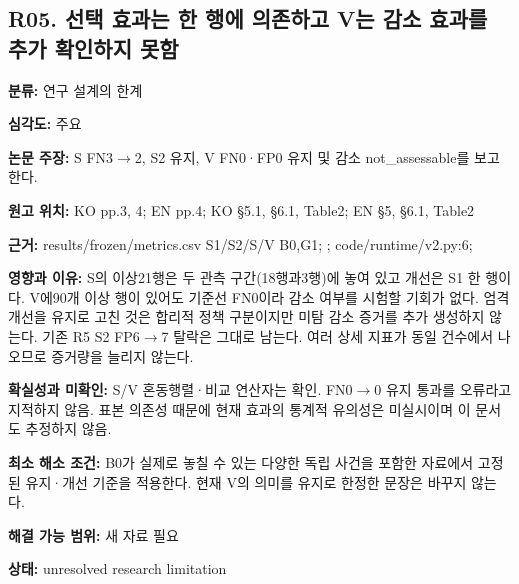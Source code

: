 \documentclass[11pt,a4paper]{article}
\begin{document}
\subsection*{R05. 선택 효과는 한 행에 의존하고 V는 감소 효과를 추가 확인하지 못함}
\textbf{분류:} 연구 설계의 한계
\par
\textbf{심각도:} 주요
\par
\textbf{논문 주장:} S FN3$\to$2, S2 유지, V FN0·FP0 유지 및 감소 not\_assessable를 보고한다.
\par
\textbf{원고 위치:} KO pp.3, 4; EN pp.4; KO §5.1, §6.1, Table2; EN §5, §6.1, Table2
\par
\textbf{근거:} results/frozen/metrics.csv S1/S2/S/V B0,G1; ; code/runtime/v2.py:6; 
\par
\textbf{영향과 이유:} S의 이상21행은 두 관측 구간(18행과3행)에 놓여 있고 개선은 S1 한 행이다. V에90개 이상 행이 있어도 기준선 FN0이라 감소 여부를 시험할 기회가 없다. 엄격 개선을 유지로 고친 것은 합리적 정책 구분이지만 미탐 감소 증거를 추가 생성하지 않는다. 기존 R5 S2 FP6$\to$7 탈락은 그대로 남는다. 여러 상세 지표가 동일 건수에서 나오므로 증거량을 늘리지 않는다.
\par
\textbf{확실성과 미확인:} S/V 혼동행렬·비교 연산자는 확인. FN0$\to$0 유지 통과를 오류라고 지적하지 않음. 표본 의존성 때문에 현재 효과의 통계적 유의성은 미실시이며 이 문서도 추정하지 않음.
\par
\textbf{최소 해소 조건:} B0가 실제로 놓칠 수 있는 다양한 독립 사건을 포함한 자료에서 고정된 유지·개선 기준을 적용한다. 현재 V의 의미를 유지로 한정한 문장은 바꾸지 않는다.
\par
\textbf{해결 가능 범위:} 새 자료 필요
\par
\textbf{상태:} unresolved research limitation
\par
\end{document}
